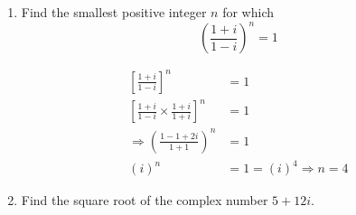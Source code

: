 \begin{enumerate}[label=\color{ocre}\textbf{\arabic*.}]
	\item Find the smallest positive integer $n$ for which
	$$
	\left(\frac{1+i}{1-i}\right)^{n}=1
	$$
	\begin{answer}
		\begin{align*}
		{\left[\frac{1+i}{1-i}\right]^{n}}&=1 \\
		{\left[\frac{1+i}{1-i} \times \frac{1+i}{1+i}\right]^{n}}&=1\\ \Rightarrow\left(\frac{1-1+2 i}{1+1}\right)^{n}&=1 \\
		(i)^{n}&=1=(i)^{4} \Rightarrow n=4
		\end{align*}
	
	\end{answer}
\item  Find the square root of the complex number $5+12 i$.


\end{enumerate}
